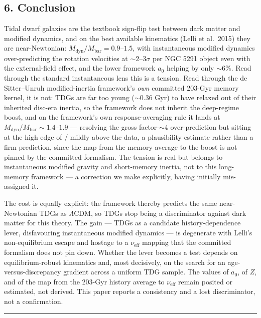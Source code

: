 \documentclass[
]{article}
\begin{document}
\subsection{6. Conclusion}\label{conclusion}

Tidal dwarf galaxies are the textbook sign-flip test between dark matter
and modified dynamics, and on the best available kinematics (Lelli et
al.~2015) they are near-Newtonian:
\(M_\mathrm{dyn}/M_\mathrm{bar}=0.9\)--\(1.5\), with instantaneous modified
dynamics over-predicting the rotation velocities at
\(\sim\!2\)--\(3\sigma\) per NGC 5291 object even with the
external-field effect, and the lower framework \(a_0\) helping by only
\(\sim\!6\%\). Read through the standard instantaneous lens this is a
tension. Read through the de Sitter--Unruh modified-inertia framework's
\emph{own} committed 203-Gyr memory kernel, it is not: TDGs are far too
young (\(\sim\!0.36\) Gyr) to have relaxed out of their inherited
disc-era inertia, so the framework does not inherit the deep-regime
boost, and on the framework's own response-averaging rule it lands at
\(M_\mathrm{dyn}/M_\mathrm{bar}\sim1.4\)--\(1.9\) --- resolving the gross
factor-\(\sim\!4\) over-prediction but sitting at the high edge of /
mildly above the data, a plausibility estimate rather than a firm
prediction, since the map from the memory average to the boost is not
pinned by the committed formalism. The tension is real but belongs to
instantaneous modified gravity and short-memory inertia, not to this
long-memory framework --- a correction we make explicitly, having
initially mis-assigned it.

The cost is equally explicit: the framework thereby predicts the same
near-Newtonian TDGs as \(\Lambda\)CDM, so TDGs stop being a
discriminator against dark matter for this theory. The gain --- TDGs as
a candidate history-dependence lever, disfavouring instantaneous
modified dynamics --- is degenerate with Lelli's non-equilibrium escape
and hostage to a \(\nu_\mathrm{eff}\) mapping that the committed formalism
does not pin down. Whether the lever becomes a test depends on
equilibrium-robust kinematics and, most decisively, on the search for an
age-versus-discrepancy gradient across a uniform TDG sample. The values
of \(a_0\), of \(Z\), and of the map from the 203-Gyr history average to
\(\nu_\mathrm{eff}\) remain posited or estimated, not derived. This paper
reports a consistency and a lost discriminator, not a confirmation.

\begin{center}\rule{0.5\linewidth}{0.5pt}\end{center}
\end{document}
